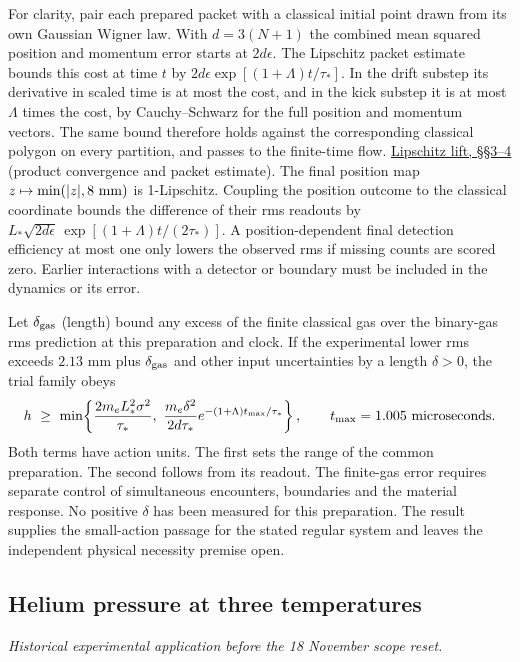\documentclass[11pt,a4paper]{article}
\begin{document}
For clarity, pair each prepared packet with a classical initial point
drawn from its own Gaussian Wigner law. With \(d=3(N+1)\) the combined
mean squared position and momentum error starts at \(2d\epsilon\). The
Lipschitz packet estimate bounds this cost at time \(t\) by
\(2d\epsilon\exp[(1+\Lambda)t/\tau_*]\). In the drift substep its
derivative in scaled time is at most the cost, and in the kick substep
it is at most \(\Lambda\) times the cost, by Cauchy--Schwarz for the
full position and momentum vectors. The same bound therefore holds
against the corresponding classical polygon on every partition, and
passes to the finite-time flow.
\href{lipschitz-certificate-quantum-lift.md}{Lipschitz lift, §§3--4}
(product convergence and packet estimate). The final position map
\(z\mapsto\min(|z|,8\ {\rm mm})\) is 1-Lipschitz. Coupling the position
outcome to the classical coordinate bounds the difference of their rms
readouts by \(L_*\sqrt{2d\epsilon}\,
\exp[(1+\Lambda)t/(2\tau_*)]\). A position-dependent final detection
efficiency at most one only lowers the observed rms if missing counts
are scored zero. Earlier interactions with a detector or boundary must
be included in the dynamics or its error.

Let \(\delta_{\rm gas}\) (length) bound any excess of the finite
classical gas over the binary-gas rms prediction at this preparation and
clock. If the experimental lower rms exceeds \(2.13\) mm plus
\(\delta_{\rm gas}\) and other input uncertainties by a length
\(\delta>0\), the trial family obeys \[
 h\ \ge\ \min\!\left\{
 \frac{2m_eL_*^2\sigma^2}{\tau_*},\
 \frac{m_e\delta^2}{2d\tau_*}
 e^{-(1+\Lambda)t_{\max}/\tau_*}\right\},
 \qquad t_{\max}=1.005\ {\rm microseconds}.
\] Both terms have action units. The first sets the range of the common
preparation. The second follows from its readout. The finite-gas error
requires separate control of simultaneous encounters, boundaries and the
material response. No positive \(\delta\) has been measured for this
preparation. The result supplies the small-action passage for the stated
regular system and leaves the independent physical necessity premise
open.

\subsection{Helium pressure at three
temperatures}\label{helium-pressure-at-three-temperatures}

\emph{Historical experimental application before the 18 November scope
reset.}
\end{document}
